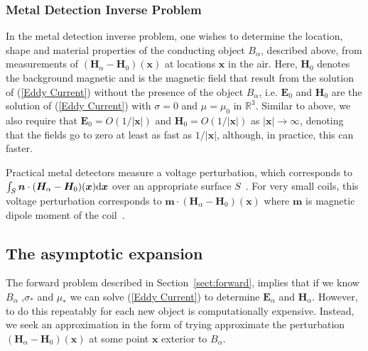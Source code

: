 \subsubsection{Metal Detection Inverse Problem} \label{sect:inverseproblem}
In the metal detection inverse problem, one wishes to determine the location, shape and material properties of the conducting object $B_\alpha$, described above, from measurements of $(\bm{H}_\alpha - \bm{H}_0) (\bm{x})$ at locations $\bm{x}$ in the air. Here, $\bm{H}_0$ denotes the background magnetic and is the magnetic field that result from the solution of (\ref{Eddy Current}) without the presence of the object $B_\alpha$, i.e.  $\bm{E}_0$ and $\bm{H}_0$ are the solution of (\ref{Eddy Current}) with $\sigma =0$ and $\mu=\mu_0$ in ${\mathbb R}^3$. Similar to above, we also require that $\bm{E}_{0}=O(1/|\bm{x}|)$ and $\bm{H}_{0}=O(1/|\bm{x}|)$  as $|\bm{x} | \to \infty$, denoting that the fields go to zero at least as fast as $1/|\bm{x}|$, although, in practice, this can faster.

Practical metal detectors measure a voltage perturbation, which corresponds to $\int_S \bm{n} \cdot (\bm{H}_\alpha - \bm{H}_0) (\bm{x}) \mathrm{d} \bm{x}$ over an appropriate surface $S$~\cite{LedgerLionheart2018}. For very small coils, this voltage perturbation corresponds to $\bm{m} \cdot (\bm{H}_\alpha - \bm{H}_0) (\bm{x})$ where $\bm{m}$ is magnetic dipole moment of the coil~\cite{LedgerLionheart2018}.



\subsection{The asymptotic expansion}
The forward problem described in Section~\ref{sect:forward}, implies that if we know $B_\alpha$ ,$ \sigma_*$ and $\mu_*$ we can solve (\ref{Eddy Current})  to determine $\bm{E}_\alpha$ and $\bm{H}_\alpha$. However, to do this repeatably for each new object is computationally expensive. Instead, we seek an approximation in the form of trying approximate the perturbation $(\bm{H}_{\alpha}-\bm{H}_0)( \bm{x})$ at some point $\bm{x}$ exterior to $B_\alpha$.

